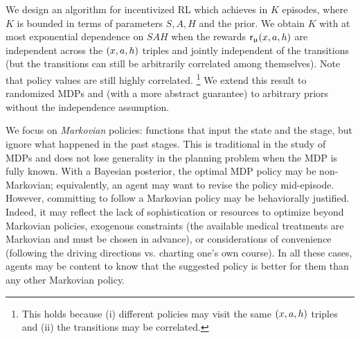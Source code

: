 

We design an algorithm for incentivized RL which achieves \traversal
in $K$ episodes, where $K$ is bounded in terms of parameters $S,A,H$ and the prior. We obtain $K$ with at most exponential dependence on $SAH$ when the rewards $\mathsf{r}_{\upmu}(x,a,h)$ are independent across the $(x,a,h)$ triples and jointly independent of the transitions (but the transitions can still be arbitrarily correlated among themselves). Note that policy values are still highly correlated.%
\footnote{This holds because (i) different policies may visit the same $(x,a,h)$ triples and (ii) the transitions may be correlated.}
We extend this result to randomized MDPs and (with a more abstract guarantee) to arbitrary priors without the independence assumption.







We focus on \emph{Markovian} policies: functions that input the state and the stage, but ignore what happened in the past stages. This is traditional in the study of MDPs and does not lose generality in the planning problem when the MDP is fully known. With a Bayesian posterior, the optimal MDP policy may be non-Markovian; equivalently, an agent may want to revise the policy mid-episode. However, committing to follow a Markovian policy may be behaviorally justified. Indeed,
it may reflect the lack of sophistication or resources to optimize beyond Markovian policies,
exogenous constraints (\eg the available medical treatments are Markovian and must be chosen in advance), or considerations of convenience (\eg following the driving directions vs. charting one's own course). In all these cases, agents may be content to know that the suggested policy is better for them than any other Markovian policy.


